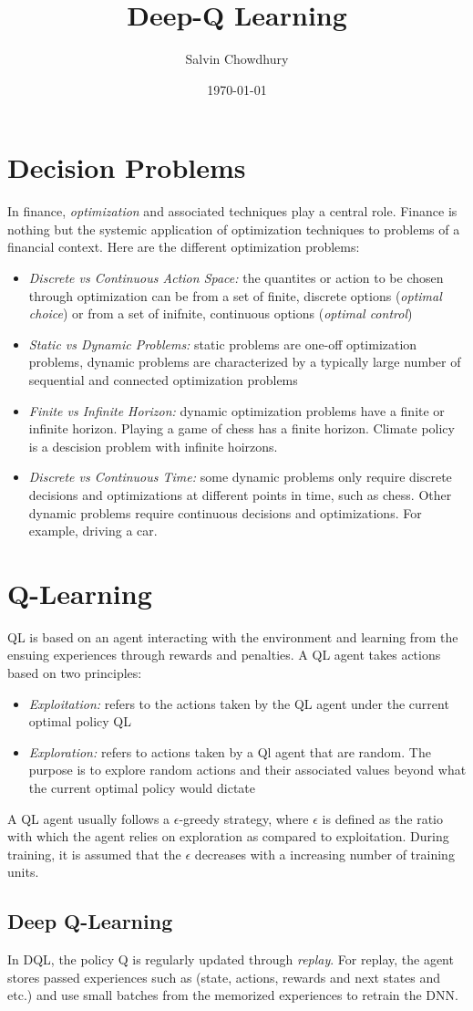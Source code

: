 \documentclass[a4paper]{article}
\title{Deep-Q Learning}
\author{Salvin Chowdhury}
\date{\today}
\begin{document}
\maketitle

\section{Decision Problems}
In finance, \textit{optimization} and associated techniques play a central role. Finance is nothing but the systemic
application of optimization techniques to problems of a financial context. Here are the different optimization
problems:

\begin{itemize}
    \item \textit{Discrete vs Continuous Action Space:} the quantites or action to be chosen through optimization
    can be from a set of finite, discrete options (\textit{optimal choice}) or from a set of inifnite, continuous 
    options (\textit{optimal control})
    \item \textit{Static vs Dynamic Problems:} static problems are one-off optimization problems, dynamic problems 
    are characterized by a typically large number of sequential and connected optimization problems
    \item \textit{Finite vs Infinite Horizon:} dynamic optimization problems have a finite or infinite horizon. 
    Playing a game of chess has a finite horizon. Climate policy is a descision problem with infinite hoirzons.
    \item \textit{Discrete vs Continuous Time:} some dynamic problems only require discrete decisions and
    optimizations at different points in time, such as chess. Other dynamic problems require continuous decisions 
    and optimizations. For example, driving a car.
\end{itemize}

\section{Q-Learning}
QL is based on an agent interacting with the environment and learning from the ensuing experiences through rewards 
and penalties. A QL agent takes actions based on two principles:
\begin{itemize}
    \item \textit{Exploitation:} refers to the actions taken by the QL agent under the current optimal policy QL
    \item \textit{Exploration:} refers to actions taken by a Ql agent that are random. The purpose is to explore
    random actions and their associated values beyond what the current optimal policy would dictate
\end{itemize}
A QL agent usually follows a $\epsilon$-greedy strategy, where $\epsilon$ is defined as the ratio with which the 
agent relies on exploration as compared to exploitation. During training, it is assumed that the $\epsilon$ decreases
with a increasing number of training units.

\subsection{Deep Q-Learning}
In DQL, the policy Q is regularly updated through \textit{replay}. For replay, the agent stores passed experiences 
such as (state, actions, rewards and next states and etc.) and use small batches from the memorized experiences 
to retrain the DNN. 
\end{document}

